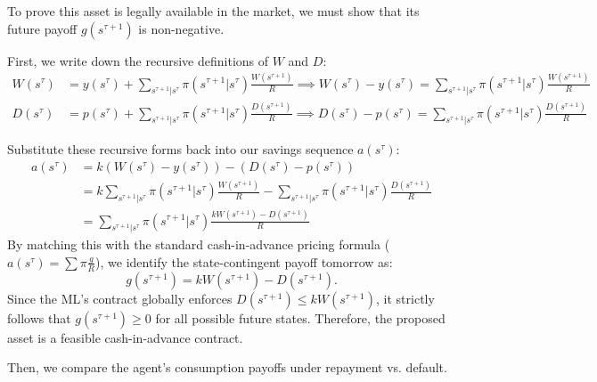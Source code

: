 To prove this asset is legally available in the market, we must show that its future payoff $g(s^{\tau+1})$ is non-negative. 

First, we write down the recursive definitions of $W$ and $D$:
\[
\begin{aligned}
    W(s^{\tau}) & = y(s^{\tau}) + \sum_{s^{\tau+1}|s^{\tau}}\pi(s^{\tau+1}|s^{\tau}) \frac{W(s^{\tau+1})}{R} \implies W(s^{\tau}) - y(s^{\tau}) = \sum_{s^{\tau+1}|s^{\tau}}\pi(s^{\tau+1}|s^{\tau}) \frac{W(s^{\tau+1})}{R}\\
    D(s^{\tau}) & = p(s^{\tau}) + \sum_{s^{\tau+1}|s^{\tau}}\pi(s^{\tau+1}|s^{\tau}) \frac{D(s^{\tau+1})}{R} \implies D(s^{\tau}) - p(s^{\tau}) = \sum_{s^{\tau+1}|s^{\tau}}\pi(s^{\tau+1}|s^{\tau}) \frac{D(s^{\tau+1})}{R}
\end{aligned}
\]

Substitute these recursive forms back into our savings sequence $a(s^{\tau})$:
\[
\begin{aligned}
    a(s^{\tau}) & = k\left(W(s^{\tau}) - y(s^{\tau})\right) - \left(D(s^{\tau}) - p(s^{\tau})\right)\\
    & = k \sum_{s^{\tau+1}|s^{\tau}}\pi(s^{\tau+1}|s^{\tau}) \frac{W(s^{\tau+1})}{R} - \sum_{s^{\tau+1}|s^{\tau}}\pi(s^{\tau+1}|s^{\tau}) \frac{D(s^{\tau+1})}{R}\\
    & = \sum_{s^{\tau+1}|s^{\tau}}\pi(s^{\tau+1}|s^{\tau}) \frac{kW(s^{\tau+1}) - D(s^{\tau+1})}{R}
\end{aligned}
\]
By matching this with the standard cash-in-advance pricing formula ($a(s^\tau) = \sum \pi \frac{g}{R}$), we identify the state-contingent payoff tomorrow as:
\[
g(s^{\tau+1}) = kW(s^{\tau+1}) - D(s^{\tau+1}).
\]
Since the ML's contract globally enforces $D(s^{\tau+1}) \le kW(s^{\tau+1})$, it strictly follows that $g(s^{\tau+1}) \ge 0$ for all possible future states. Therefore, the proposed asset is a feasible cash-in-advance contract.

Then, we compare the agent's consumption payoffs under repayment vs. default.

